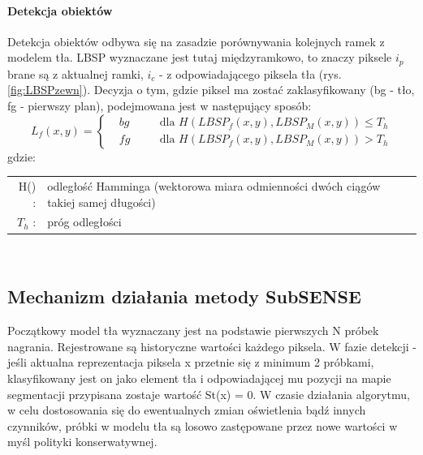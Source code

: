 \paragraph{Detekcja obiektów \\}
Detekcja obiektów odbywa się na zasadzie porównywania kolejnych ramek z modelem tła. LBSP wyznaczane jest tutaj międzyramkowo, to znaczy piksele $i_{p}$ brane są z aktualnej ramki, $i_{c}$ - z odpowiadającego piksela tła (rys. \ref{fig:LBSPzewn}). Decyzja o tym, gdzie piksel ma zostać zaklasyfikowany (bg - tło, fg - pierwszy plan), podejmowana jest w następujący sposób:
\begin{equation}
L_{f}(x,y)=\left\{
\begin{split}
&bg & \quad &\text{dla $H(LBSP_{f}(x,y),LBSP_{M}(x,y))\leq T_{h}$} \\
&fg & \quad &\text{dla $H(LBSP_{f}(x,y),LBSP_{M}(x,y))>T_{h}$}
\end{split}
\right.
\end{equation}
gdzie:\\ 
\hspace*{3em}
\begin{tabular}{r p{}}
H() : &  odległość Hamminga (wektorowa miara odmienności dwóch ciągów takiej samej długości)\\
$T_{h}$ : & próg odległości\\
\end{tabular} \\

\subsection{Mechanizm działania metody SubSENSE}
Początkowy model tła wyznaczany jest na podstawie pierwszych N próbek nagrania. Rejestrowane są historyczne wartości każdego piksela. W fazie detekcji - jeśli aktualna reprezentacja piksela x przetnie się z minimum 2 próbkami, klasyfikowany jest on jako element tła i odpowiadającej mu pozycji na mapie segmentacji przypisana zostaje wartość St(x) = 0. W czasie działania algorytmu, w celu dostosowania się do ewentualnych zmian oświetlenia bądź innych czynników, próbki w modelu tła są losowo zastępowane przez nowe wartości w myśl polityki konserwatywnej.
